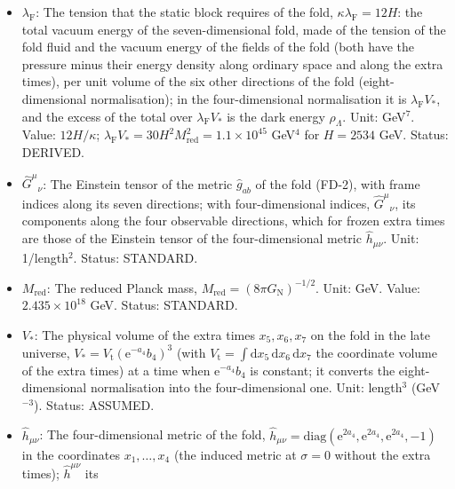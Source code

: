 \documentclass[
  10pt,
]{article}
\begin{document}
\begin{itemize}
  \(\delta^{M_1M_2\cdots}_{N_1N_2\cdots}\), the determinant of the
  square matrix of the Kronecker deltas \(\delta^{M_a}_{N_b}\) (\(+1\)
  or \(-1\) if the upper indices are an even or odd permutation of the
  lower ones, 0 otherwise). Status: STANDARD.
\item
  \(\lambda_{\mathrm{F}}\): The tension that the static block requires
  of the fold, \(\kappa\lambda_{\mathrm{F}} = 12H\): the total vacuum
  energy of the seven-dimensional fold, made of the tension of the fold
  fluid and the vacuum energy of the fields of the fold (both have the
  pressure minus their energy density along ordinary space and along the
  extra times), per unit volume of the six other directions of the fold
  (eight-dimensional normalisation); in the four-dimensional
  normalisation it is \(\lambda_{\mathrm{F}}V_*\), and the excess of the
  total over \(\lambda_{\mathrm{F}}V_*\) is the dark energy
  \(\rho_\Lambda\). Unit: GeV\(^7\). Value: \(12H/\kappa\);
  \(\lambda_{\mathrm{F}}V_* = 30H^2M_{\mathrm{red}}^2 = 1.1\times10^{45}\)
  GeV\(^4\) for \(H = 2534\) GeV. Status: DERIVED.
\item
  \(\hat G^\mu{}_\nu\): The Einstein tensor of the metric
  \(\hat g_{ab}\) of the fold (FD-2), with frame indices along its seven
  directions; with four-dimensional indices, \(\hat G^\mu{}_\nu\), its
  components along the four observable directions, which for frozen
  extra times are those of the Einstein tensor of the four-dimensional
  metric \(\hat h_{\mu\nu}\). Unit: 1/length\(^2\). Status: STANDARD.
\item
  \(M_{\mathrm{red}}\): The reduced Planck mass,
  \(M_{\mathrm{red}} = (8\pi G_{\mathrm{N}})^{-1/2}\). Unit: GeV. Value:
  \(2.435\times10^{18}\) GeV. Status: STANDARD.
\item
  \(V_*\): The physical volume of the extra times \(x_5, x_6, x_7\) on
  the fold in the late universe,
  \(V_* = V_{\mathrm{t}}(\mathrm{e}^{-a_4}b_4)^3\) (with
  \(V_{\mathrm{t}} = \int\mathrm{d}x_5\,\mathrm{d}x_6\,\mathrm{d}x_7\)
  the coordinate volume of the extra times) at a time when
  \(\mathrm{e}^{-a_4}b_4\) is constant; it converts the
  eight-dimensional normalisation into the four-dimensional one. Unit:
  length\(^3\) (GeV\(^{-3}\)). Status: ASSUMED.
\item
  \(\hat h_{\mu\nu}\): The four-dimensional metric of the fold,
  \(\hat h_{\mu\nu} = \mathrm{diag}(\mathrm{e}^{2a_4}, \mathrm{e}^{2a_4}, \mathrm{e}^{2a_4}, -1)\)
  in the coordinates \(x_1, \dots, x_4\) (the induced metric at
  \(\sigma = 0\) without the extra times); \(\hat h^{\mu\nu}\) its

\end{itemize}
\end{document}
